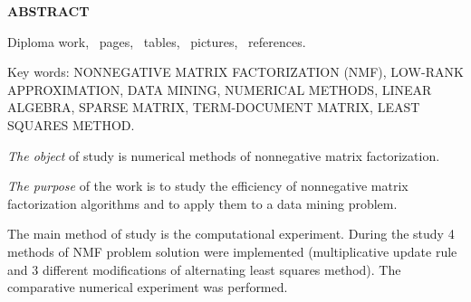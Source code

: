 










\thispagestyle{empty}
\begin{center}
  \fontsize{16pt}{0em}\textbf{ABSTRACT}
\end{center}

Diploma work, \npages\ pages, \ntables\ tables, \nris\ pictures, \ncite\ references.

Key words:
NONNEGATIVE MATRIX FACTORIZATION (NMF),
LOW-RANK APPROXIMATION,
DATA MINING,
NUMERICAL METHODS,
LINEAR \\ ALGEBRA,
SPARSE MATRIX,
TERM-DOCUMENT MATRIX,
LEAST SQUARES METHOD.

\textit{The object} of study is numerical methods of nonnegative matrix factorization.


\textit{The purpose} of the work is to study the efficiency of nonnegative
matrix factorization algorithms and to apply them to a data mining problem.

The main method of study is the computational experiment.
During the study 4 methods of NMF problem solution were implemented
(multiplicative update rule and 3 different modifications of alternating least squares method).
The comparative numerical experiment was performed.

